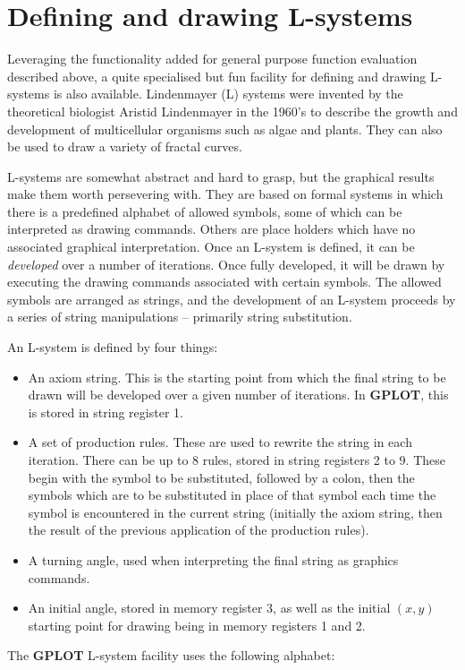 \documentclass[a4paper,twoside,11pt]{article}
\newcommand{\newpara}{\par\vspace{4mm}\noindent}
\begin{document}
\section{Defining and drawing L-systems}
Leveraging the functionality added for general purpose function evaluation described above, a quite specialised but
fun facility for defining and drawing L-systems is also available. Lindenmayer (L) systems were invented by the theoretical
biologist Aristid Lindenmayer in the 1960's to describe the growth and development of multicellular organisms such as 
algae and plants. They can also be used to draw a variety of fractal curves.
\newpara
L-systems are somewhat abstract and hard to grasp, but the graphical results make them worth persevering with.
They are based on formal systems in which there is a predefined alphabet of allowed symbols, some of which can
be interpreted as drawing commands. Others are place holders which have no associated graphical interpretation.
Once an L-system is defined, it can be \emph{developed} over a number of iterations. Once fully developed, it
will be drawn by executing the drawing commands associated with certain symbols. 
The allowed symbols are arranged as strings, and the development of an L-system proceeds by a series of
string manipulations -- primarily string substitution.
\newpara
An L-system is defined by four things:
\begin{itemize}
\item An axiom string. This is the starting point from which the final string to be drawn will be developed over a given
	number of iterations. In \textbf{GPLOT}, this is stored in string register 1.
\item A set of production rules. These are used to rewrite the string in each iteration. There can be up to 8 rules,
	stored in string registers 2 to 9. These begin with the symbol to be substituted, followed by a colon, then the
	symbols which are to be substituted in place of that symbol each time the symbol is encountered in the current
	string (initially the axiom string, then the result of the previous application of the production rules).
\item A turning angle, used when interpreting the final string as graphics commands.
\item An initial angle, stored in memory register 3, as well as
	the initial $(x,y)$ starting point for drawing being in memory registers 1 and 2.
\end{itemize}
\newpara
The \textbf{GPLOT} L-system facility uses the following alphabet:\\
\end{document}

